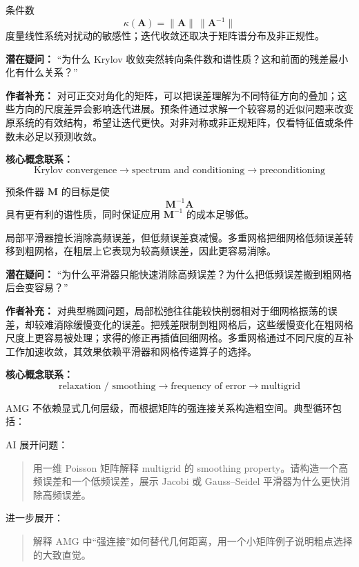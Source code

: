 \documentclass[11pt,openany]{ctexbook}
\begin{document}
条件数
\[
\kappa(\bm A)=\|\bm A\|\,\|\bm A^{-1}\|
\]
度量线性系统对扰动的敏感性；迭代收敛还取决于矩阵谱分布及非正规性。

\begin{authornote}
\textbf{潜在疑问：}
“为什么 Krylov 收敛突然转向条件数和谱性质？这和前面的残差最小化有什么关系？”

\textbf{作者补充：}
对可正交对角化的矩阵，可以把误差理解为不同特征方向的叠加；这些方向的尺度差异会影响迭代进展。预条件通过求解一个较容易的近似问题来改变原系统的有效结构，希望让迭代更快。对非对称或非正规矩阵，仅看特征值或条件数未必足以预测收敛。

\textbf{核心概念联系：}
\[
\text{Krylov convergence}
\longrightarrow
\text{spectrum and conditioning}
\longrightarrow
\text{preconditioning}
\]
\end{authornote}

预条件器 \(\bm M\) 的目标是使
\[
\bm M^{-1}\bm A
\]
具有更有利的谱性质，同时保证应用 \(\bm M^{-1}\) 的成本足够低。

局部平滑器擅长消除高频误差，但低频误差衰减慢。多重网格把细网格低频误差转移到粗网格，在粗层上它表现为较高频误差，因此更容易消除。

\begin{authornote}
\textbf{潜在疑问：}
“为什么平滑器只能快速消除高频误差？为什么把低频误差搬到粗网格后会变容易？”

\textbf{作者补充：}
对典型椭圆问题，局部松弛往往能较快削弱相对于细网格振荡的误差，却较难消除缓慢变化的误差。把残差限制到粗网格后，这些缓慢变化在粗网格尺度上更容易被处理；求得的修正再插值回细网格。多重网格通过不同尺度的互补工作加速收敛，其效果依赖平滑器和网格传递算子的选择。

\textbf{核心概念联系：}
\[
\text{relaxation / smoothing}
\longrightarrow
\text{frequency of error}
\longrightarrow
\text{multigrid}
\]
\end{authornote}

AMG 不依赖显式几何层级，而根据矩阵的强连接关系构造粗空间。典型循环包括：

\begin{askai}
AI 展开问题：
\begin{quote}
用一维 Poisson 矩阵解释 multigrid 的 smoothing property。请构造一个高频误差和一个低频误差，展示 Jacobi 或 Gauss--Seidel 平滑器为什么更快消除高频误差。
\end{quote}

进一步展开：
\begin{quote}
解释 AMG 中“强连接”如何替代几何距离，用一个小矩阵例子说明粗点选择的大致直觉。
\end{quote}
\end{askai}
\end{document}
